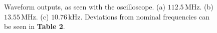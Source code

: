 \documentclass[lettersize,journal]{IEEEtran}
\begin{document}
\begin{figure}[!t]
\centering
{}
\hfil
{}
\hfil
{}
\caption{Waveform outputs, as seen with the oscilloscope. (a) $112.5 \,\text{MHz}$. (b) $13.55 \, \text{MHz}$. (c) $10.76 \, \text{kHz}$. Deviations from nominal frequencies can be seen in {\bf{Table 2}}.}
\label{fig_sim}
\end{figure}
\end{document}
